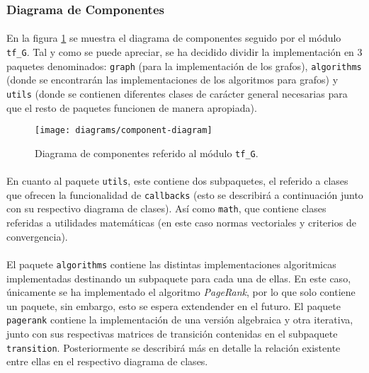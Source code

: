 \documentclass{subfiles}
\begin{document}
        \subsubsection{Diagrama de Componentes}
        \label{sec:component_diagram}

          \paragraph{}
          En la figura \ref{img:component_diagram} se muestra el diagrama de componentes seguido por el módulo \texttt{tf\_G}. Tal y como se puede apreciar, se ha decidido dividir la implementación en 3 paquetes denominados: \texttt{graph} (para la implementación de los grafos), \texttt{algorithms} (donde se encontrarán las implementaciones de los algoritmos para grafos) y \texttt{utils} (donde se contienen diferentes clases de carácter general necesarias para que el resto de paquetes funcionen de manera apropiada).

          \begin{figure}[h!]
            \centering
            \texttt{[image: diagrams/component-diagram]}
            \caption{Diagrama de componentes referido al módulo \texttt{tf\_G}.}
            \label{img:component_diagram}
          \end{figure}

          \paragraph{}
          En cuanto al paquete \texttt{utils}, este contiene dos subpaquetes, el referido a clases que ofrecen la funcionalidad de \texttt{callbacks} (esto se describirá a continuación junto con su respectivo diagrama de clases). Así como \texttt{math}, que contiene clases referidas a utilidades matemáticas (en este caso normas vectoriales y criterios de convergencia).

          \paragraph{}
          El paquete \texttt{algorithms} contiene las distintas implementaciones algoritmicas implementadas destinando un subpaquete para cada una de ellas. En este caso, únicamente se ha implementado el algoritmo \emph{PageRank}, por lo que solo contiene un paquete, sin embargo, esto se espera extendender en el futuro. El paquete \texttt{pagerank} contiene la implementación de una versión algebraica y otra iterativa, junto con sus respectivas matrices de transición contenidas en el subpaquete \texttt{transition}. Posteriormente se describirá más en detalle la relación existente entre ellas en el respectivo diagrama de clases.
\end{document}

